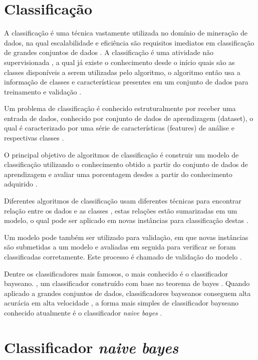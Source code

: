 \documentclass[
	12pt,				%
	oneside,			%
	a4paper,			%
	english,			%
	brazil				%
	]{abntex2ppgsi}
\begin{document}
\section{Classificação}
A classificação é uma técnica vastamente utilizada no domínio de mineração de dados, na qual escalabilidade e eficiência são requisitos imediatos em classificação de grandes conjuntos de dados \cite{sharma2015}. A classificação é uma atividade não supervisionada \cite{ sharma2015},  a qual já existe o conhecimento desde o início quais são as classes disponíveis a serem utilizadas pelo algoritmo, o algoritmo então usa a informação de classes e características presentes em um conjunto de dados para treinamento e validação \cite{ sharma2015}.

Um problema de classificação é conhecido estruturalmente por receber uma entrada de dados, conhecido por conjunto de dados de aprendizagem (dataset), o qual é caracterizado por uma série de características (features) de análise e respectivas classes \cite{ Seth2016}. 

O principal objetivo de algoritmos de classificação é construir um modelo de classificação utilizando o conhecimento obtido a partir do conjunto de dados de aprendizagem e avaliar uma porcentagem desdes a partir do conhecimento adquirido \cite{ Seth2016}.

Diferentes algoritmos de classificação usam diferentes técnicas para encontrar relação entre os dados e as classes  \cite{ sharma2015}, estas relações estão sumarizadas em um modelo, o qual pode ser aplicado em novas instâncias para classificação destas  \cite{ sharma2015}.

Um modelo pode também ser utilizado para validação, em que novas instâncias são submetidas a um modelo e avaliadas em seguida para verificar se foram classificadas corretamente. Este processo é chamado de validação do modelo  \cite{ sharma2015}.

Dentre os classificadores mais famosos, o mais conhecido é o classificador bayseano. \cite{ Seth2016}, um classificador construído com base no teorema de bayes \cite{ Seth2016}. Quando aplicado a grandes conjuntos de dados, classificadores bayseanos conseguem alta acurácia em alta velocidade \cite{ Seth2016}, a forma mais simples de classificador bayseano conhecido atualmente é o classificador \textit{naive bayes} \cite{ Seth2016}.

\section{Classificador \textit{naive bayes}}
\end{document}
